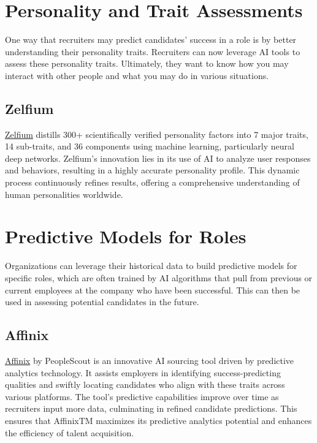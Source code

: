 \documentclass[
]{book}
\begin{document}
\hypertarget{personality-and-trait-assessments}{%
\section{Personality and Trait Assessments}\label{personality-and-trait-assessments}}

One way that recruiters may predict candidates' success in a role is by better understanding their personality traits. Recruiters can now leverage AI tools to assess these personality traits. Ultimately, they want to know how you may interact with other people and what you may do in various situations.

\hypertarget{zelfium}{%
\subsection{Zelfium}\label{zelfium}}

\href{https://www.zelfium.com/\#/}{Zelfium} distills 300+ scientifically verified personality factors into 7 major traits, 14 sub-traits, and 36 components using machine learning, particularly neural deep networks. Zelfium's innovation lies in its use of AI to analyze user responses and behaviors, resulting in a highly accurate personality profile. This dynamic process continuously refines results, offering a comprehensive understanding of human personalities worldwide.

\hypertarget{predictive-models-for-roles}{%
\section{Predictive Models for Roles}\label{predictive-models-for-roles}}

Organizations can leverage their historical data to build predictive models for specific roles, which are often trained by AI algorithms that pull from previous or current employees at the company who have been successful. This can then be used in assessing potential candidates in the future.

\hypertarget{affinix}{%
\subsection{Affinix}\label{affinix}}

\href{https://www.peoplescout.com/technology/}{Affinix} by PeopleScout is an innovative AI sourcing tool driven by predictive analytics technology. It assists employers in identifying success-predicting qualities and swiftly locating candidates who align with these traits across various platforms. The tool's predictive capabilities improve over time as recruiters input more data, culminating in refined candidate predictions. This ensures that AffinixTM maximizes its predictive analytics potential and enhances the efficiency of talent acquisition.
\end{document}
